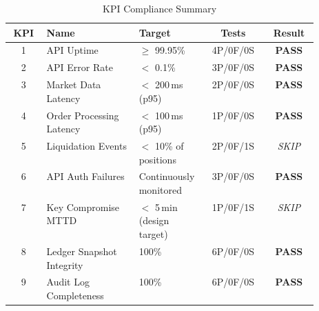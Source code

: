\begin{table}[H]
\centering
\renewcommand{\arraystretch}{1.4}
\setlength{\tabcolsep}{6pt}
\caption{KPI Compliance Summary}
\label{tab:kpi_summary}
\begin{tabular}{|c|p{0.30\linewidth}|p{0.22\linewidth}|c|c|}
\hline
\textbf{KPI} & \textbf{Name} & \textbf{Target} & \textbf{Tests} & \textbf{Result} \\
\hline
1 & API Uptime & $\geq$ 99.95\% & 4P/0F/0S & \textbf{PASS} \\
\hline
2 & API Error Rate & $<$ 0.1\% & 3P/0F/0S & \textbf{PASS} \\
\hline
3 & Market Data Latency & $<$ 200\,ms (p95) & 2P/0F/0S & \textbf{PASS} \\
\hline
4 & Order Processing Latency & $<$ 100\,ms (p95) & 1P/0F/0S & \textbf{PASS} \\
\hline
5 & Liquidation Events & $<$ 10\% of positions & 2P/0F/1S & \textit{SKIP} \\
\hline
6 & API Auth Failures & Continuously monitored & 3P/0F/0S & \textbf{PASS} \\
\hline
7 & Key Compromise MTTD & $<$ 5\,min (design target) & 1P/0F/1S & \textit{SKIP} \\
\hline
8 & Ledger Snapshot Integrity & 100\% & 6P/0F/0S & \textbf{PASS} \\
\hline
9 & Audit Log Completeness & 100\% & 6P/0F/0S & \textbf{PASS} \\
\hline
\end{tabular}
\end{table}
